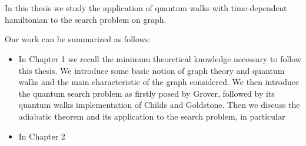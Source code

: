 \newpage
\chapter*{\hspace{10pt}}


In this thesis we study the application of quantum walks with time-dependent hamiltonian to the search problem on graph.


Our work can be summarized as follows:
\begin{itemize}
\item In Chapter 1  we recall the minimum theoretical knowledge necessary to follow this thesis. We introduce some basic notion of graph theory and quantum walks and the main characteristic of the graph considered. We then introduce the quantum search problem as firstly posed by Grover, followed by its quantum walks implementation of Childs and Goldstone. Then we discuss the adiabatic theorem and its application to the search problem, in particular  
\item In Chapter 2
\end{itemize}
